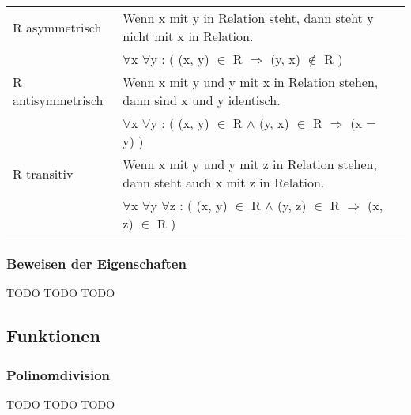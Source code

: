 \documentclass[6pt,a4paper]{scrartcl}
\begin{document}
\begin{multicols*}{2}
\begin{tabular}{lll}
R asymmetrisch		& Wenn x mit y in Relation steht, dann steht y nicht mit x in Relation.							\\
& $\forall$x $\forall$y : ( (x, y) $\in$ R $\Rightarrow$ (y, x) $\notin$ R ) \\
R antisymmetrisch	& Wenn x mit y und y mit x in Relation stehen, dann sind x und y identisch.						\\
& $\forall$x $\forall$y : ( (x, y) $\in$ R $\land$ (y, x) $\in$ R $\Rightarrow$ (x = y) ) \\
R transitiv			& Wenn x mit y und y mit z in Relation stehen, dann steht auch x mit z in Relation.				\\
& $\forall$x $\forall$y $\forall$z : ( (x, y) $\in$ R $\land$ (y, z) $\in$ R $\Rightarrow$ (x, z) $\in$ R ) \\
\end{tabular}

\subsubsection{Beweisen der Eigenschaften}
TODO TODO TODO\\

\subsection{Funktionen}
\subsubsection{Polinomdivision}
TODO TODO TODO\\


\end{multicols*}
\end{document}

